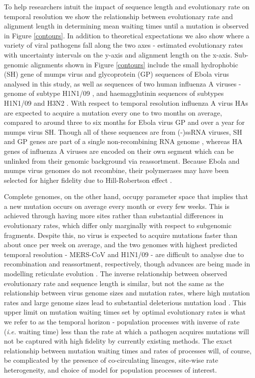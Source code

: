 \documentclass[11pt,oneside,letterpaper]{article}
\begin{document}
To help researchers intuit the impact of sequence length and evolutionary rate on temporal resolution we show the relationship between evolutionary rate and alignment length in determining mean waiting times until a mutation is observed in Figure \ref{contours}.
In addition to theoretical expectations we also show where a variety of viral pathogens fall along the two axes - estimated evolutionary rates with uncertainty intervals on the y-axis and alignment length on the x-axis.
Sub-genomic alignments shown in Figure \ref{contours} include the small hydrophobic (SH) gene of mumps virus \citep{cui_evolutionary_2017} and glycoprotein (GP) sequences of Ebola virus analysed in this study, as well as sequences of two human influenza A viruses - genome of subtype H1N1/09 \citep{hedge_real-time_2013}, and haemagglutinin sequences of subtypes H1N1/09 \citep{smith_origins_2009} and H3N2 \citep{rambaut_genomic_2008}.
With respect to temporal resolution influenza A virus HAs are expected to acquire a mutation every one to two months on average, compared to around three to six months for Ebola virus GP and over a year for mumps virus SH.
Though all of these sequences are from (-)ssRNA viruses, SH and GP genes are part of a single non-recombining RNA genome \citep{chare_phylogenetic_2003}, whereas HA genes of influenza A viruses are encoded on their own segment which can be unlinked from their genomic background via reassortment.
Because Ebola and mumps virus genomes do not recombine, their polymerases may have been selected for higher fidelity due to Hill-Robertson effect \citep{hill_effect_1966}.

Complete genomes, on the other hand, occupy parameter space that implies that a new mutation occurs on average every month or every few weeks.
This is achieved through having more sites rather than substantial differences in evolutionary rates, which differ only marginally with respect to subgenomic fragments.
Despite this, no virus is expected to acquire mutations faster than about once per week on average, and the two genomes with highest predicted temporal resolution - MERS-CoV and H1N1/09 - are difficult to analyse due to recombination and reassortment, respectively, though advances are being made in modelling reticulate evolution \citep{vaughan_inferring_2017}.
The inverse relationship between observed evolutionary rate and sequence length is similar, but not the same as the relationship between virus genome sizes and mutation rates, where high mutation rates and large genome sizes lead to substantial deleterious mutation load \citep{pybus_phylogenetic_2007,gago_extremely_2009}.
This upper limit on mutation waiting times set by optimal evolutionary rates is what we refer to as the temporal horizon - population processes with inverse of rate (\textit{i.e.} waiting time) less than the rate at which a pathogen acquires mutations will not be captured with high fidelity by currently existing methods.
The exact relationship between mutation waiting times and rates of processes will, of course, be complicated by the presence of co-circulating lineages, site-wise rate heterogeneity, and choice of model for population processes of interest.
\end{document}
